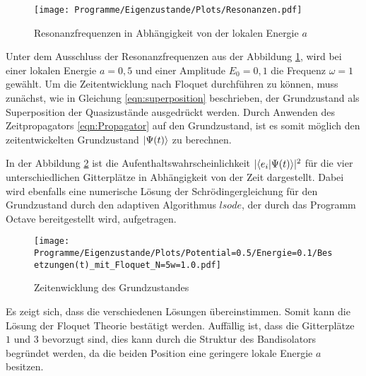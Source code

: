 \begin{figure}
  \centering
  \texttt{[image: Programme/Eigenzustande/Plots/Resonanzen.pdf]}
  \caption{Resonanzfrequenzen in Abhängigkeit von der lokalen Energie $a$}
  \label{fig:Resonanz}
\end{figure}


Unter dem Ausschluss der Resonanzfrequenzen aus der
 Abbildung \ref{fig:Resonanz}, wird bei einer lokalen Energie
$a=0,5$ und einer Amplitude $E_0=0,1$ die Frequenz $\omega=1$ gewählt.
Um die Zeitentwicklung nach Floquet durchführen zu können, muss
zunächst, wie in Gleichung \eqref{eqn:superposition} beschrieben, der Grundzustand
als Superposition der Quasizustände ausgedrückt werden.
Durch Anwenden des Zeitpropagators \eqref{eqn:Propagator} auf den Grundzustand,
 ist es somit möglich den zeitentwickelten Grundzustand
$\ket{\Psi(t)}$ zu berechnen.

In der Abbildung \ref{fig:zeitentwicklung} ist
die Aufenthaltswahrscheinlichkeit
$\lvert\braket{e_i|\Psi(t)}\rvert^2$ für
die vier unterschiedlichen Gitterplätze in Abhängigkeit von der Zeit dargestellt.
Dabei wird ebenfalls eine numerische Lösung
der Schrödingergleichung für den Grundzustand durch den
adaptiven Algorithmus $\textit{lsode}$,
der durch das Programm Octave \cite{octave}bereitgestellt wird, aufgetragen.

\begin{figure}
  \centering
  \texttt{[image: Programme/Eigenzustande/Plots/Potential=0.5/Energie=0.1/Besetzungen(t)\_mit\_Floquet\_N=5w=1.0.pdf]}
  \caption{Zeitenwicklung des Grundzustandes}
  \label{fig:zeitentwicklung}
\end{figure}

Es zeigt sich, dass die verschiedenen Lösungen übereinstimmen. Somit kann die Lösung der Floquet Theorie bestätigt werden.
Auffällig ist, dass die Gitterplätze $1$ und $3$
bevorzugt sind, dies kann durch die Struktur des Bandisolators begründet werden, da
die beiden Position eine geringere lokale Energie $a$ besitzen.
%

